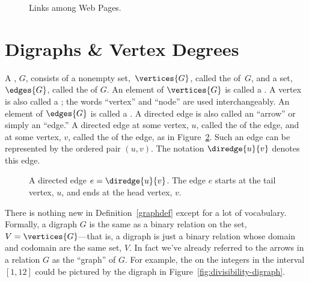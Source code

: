 \iffalse

and in the following graph the vertices $x_1, \ldots, x_n$ correspond
to web pages and $\diredge{x_i}{x_j}$ is a directed edge when page
$x_i$ contains a hyperlink to page $x_j$.
\fi


\begin{figure}


\caption{Links among Web Pages.}

\label{webpage-links}

\end{figure}

\section{Digraphs \& Vertex Degrees}

\begin{definition}\label{graphdef}
  A , $G$, consists of a nonempty
  set,~$\vertices{G}$, called the  of~$G$, and a set,
  $\edges{G}$, called the  of $G$.  An element of
  $\vertices{G}$ is called a .  A vertex is also called a
  ; the words ``vertex'' and ``node'' are used
  interchangeably.  An element of $\edges{G}$ is called a
  .  A directed edge is also called an ``arrow''
  or simply an ``edge.''  A directed edge  at some vertex, $u$, called the 
  of the edge, and  at some vertex,
  $v$, called the  of the edge, as in Figure~\ref{fig:6EA}.
  Such an edge can be represented by the ordered pair $(u,v)$.  The
  notation $\diredge{u}{v}$ denotes this edge.
\end{definition}

\begin{figure}


\caption{A directed edge $e = \diredge{u}{v}$.  The edge $e$ starts at
  the tail vertex, $u$, and ends at the head vertex, $v$.}

\label{fig:6EA}
\end{figure}

There is nothing new in Definition~\ref{graphdef} except for a lot of
vocabulary.  Formally, a digraph $G$ is the same as a binary relation
on the set, $V = \vertices{G}$---that is, a digraph is just a binary
relation whose domain and codomain are the same set, $V$.  In fact
we've already referred to the arrows in a relation $G$ as the
``graph'' of $G$.  For example, the  on the
integers in the interval $[1,12]$ could be pictured by the digraph in
Figure~\ref{fig:divisibility-digraph}.

